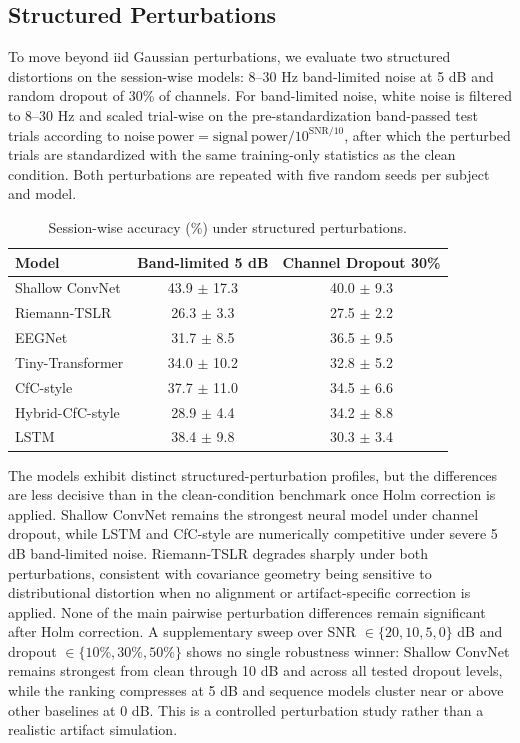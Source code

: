 \documentclass[journal]{IEEEtran}
\begin{document}
\subsection{Structured Perturbations}
To move beyond iid Gaussian perturbations, we evaluate two structured distortions on the session-wise models: 8--30 Hz band-limited noise at 5 dB and random dropout of 30\% of channels. For band-limited noise, white noise is filtered to 8--30 Hz and scaled trial-wise on the pre-standardization band-passed test trials according to $\mathrm{noise\ power} = \mathrm{signal\ power}/10^{\mathrm{SNR}/10}$, after which the perturbed trials are standardized with the same training-only statistics as the clean condition. Both perturbations are repeated with five random seeds per subject and model.

\begin{table}[t]
  \centering
  \footnotesize
  \caption{Session-wise accuracy ($\%$) under structured perturbations.}
  \begin{tabular}{lcc}
    \toprule
    \textbf{Model} & \textbf{Band-limited 5 dB} & \textbf{Channel Dropout 30\%} \\
    \midrule
    Shallow ConvNet & 43.9 $\pm$ 17.3 & 40.0 $\pm$ 9.3 \\
    Riemann-TSLR & 26.3 $\pm$ 3.3 & 27.5 $\pm$ 2.2 \\
    EEGNet & 31.7 $\pm$ 8.5 & 36.5 $\pm$ 9.5 \\
    Tiny-Transformer & 34.0 $\pm$ 10.2 & 32.8 $\pm$ 5.2 \\
    CfC-style & 37.7 $\pm$ 11.0 & 34.5 $\pm$ 6.6 \\
    Hybrid-CfC-style & 28.9 $\pm$ 4.4 & 34.2 $\pm$ 8.8 \\
    LSTM & 38.4 $\pm$ 9.8 & 30.3 $\pm$ 3.4 \\
    \bottomrule
  \end{tabular}
  \label{tab:noise}
\end{table}

The models exhibit distinct structured-perturbation profiles, but the differences are less decisive than in the clean-condition benchmark once Holm correction is applied. Shallow ConvNet remains the strongest neural model under channel dropout, while LSTM and CfC-style are numerically competitive under severe 5 dB band-limited noise. Riemann-TSLR degrades sharply under both perturbations, consistent with covariance geometry being sensitive to distributional distortion when no alignment or artifact-specific correction is applied. None of the main pairwise perturbation differences remain significant after Holm correction. A supplementary sweep over SNR $\in \{20,10,5,0\}$ dB and dropout $\in \{10\%,30\%,50\%\}$ shows no single robustness winner: Shallow ConvNet remains strongest from clean through 10 dB and across all tested dropout levels, while the ranking compresses at 5 dB and sequence models cluster near or above other baselines at 0 dB. This is a controlled perturbation study rather than a realistic artifact simulation.
\end{document}
